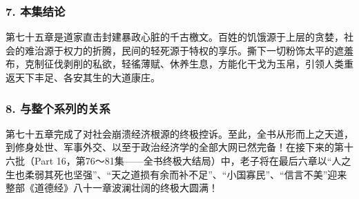 \subsubsection{7. 本集结论}
第七十五章是道家直击封建暴政心脏的千古檄文。百姓的饥饿源于上层的贪婪，社会的难治源于权力的折腾，民间的轻死源于特权的享乐。撕下一切粉饰太平的遮羞布，克制征伐剥削的私欲，轻徭薄赋、休养生息，方能化干戈为玉帛，引领人类重返天下丰足、各安其生的大道康庄。

\subsubsection{8. 与整个系列的关系}
第七十五章完成了对社会崩溃经济根源的终极控诉。至此，全书从形而上之天道，到修身处世、军事外交、以至于政治经济学的全部大网已然完备！在接下来的第十六批（Part 16，第76～81集——全书终极大结局）中，老子将在最后六章以“人之生也柔弱其死也坚强”、“天之道损有余而补不足”、“小国寡民”、“信言不美”迎来整部《道德经》八十一章波澜壮阔的终极大圆满！